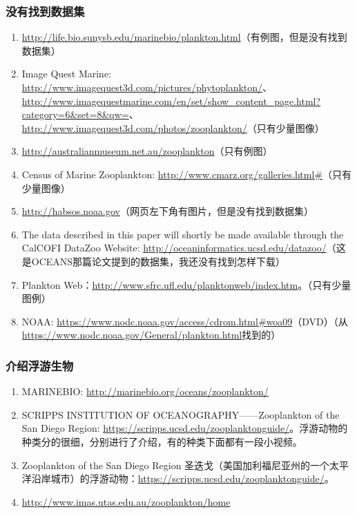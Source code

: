 \subsubsection{没有找到数据集}
\begin{enumerate}
\item \url{http://life.bio.sunysb.edu/marinebio/plankton.html}（有例图，但是没有找到数据集）

\item Image Quest Marine: \url{http://www.imagequest3d.com/pictures/phytoplankton/}、\url{http://www.imagequestmarine.com/en/set/show_content_page.html?category=6&set=8&qw=}、\url{http://www.imagequest3d.com/photos/zooplankton/}（只有少量图像）

\item \url{http://australianmuseum.net.au/zooplankton}（只有例图）

\item Census of Marine Zooplankton: \url{http://www.cmarz.org/galleries.html#}（只有少量图像）

\item \url{http://habsos.noaa.gov}（网页左下角有图片，但是没有找到数据集）

\item The data described in this paper will shortly be made available through the CalCOFI DataZoo Website: \url{http://oceaninformatics.ucsd.edu/datazoo/}（这是OCEANS那篇论文提到的数据集，我还没有找到怎样下载）

\item Plankton Web：\url{http://www.sfrc.ufl.edu/planktonweb/index.htm}。（只有少量图例）

\item NOAA: \url{https://www.nodc.noaa.gov/access/cdrom.html#woa09}（DVD）（从\url{https://www.nodc.noaa.gov/General/plankton.html}找到的）
\end{enumerate}





\subsubsection{介绍浮游生物}
\begin{enumerate}
\item MARINEBIO: \url{http://marinebio.org/oceans/zooplankton/}

\item SCRIPPS INSTITUTION OF OCEANOGRAPHY——Zooplankton of the San Diego Region: \url{https://scripps.ucsd.edu/zooplanktonguide/}。浮游动物的种类分的很细，分别进行了介绍，有的种类下面都有一段小视频。

\item Zooplankton of the San Diego Region 圣迭戈（美国加利福尼亚州的一个太平洋沿岸城市）的浮游动物：\url{https://scripps.ucsd.edu/zooplanktonguide/}。

\item \url{http://www.imas.utas.edu.au/zooplankton/home}
\end{enumerate}



